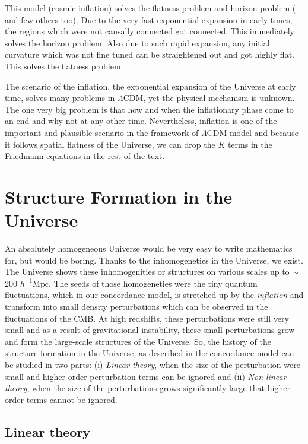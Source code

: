 This model (cosmic inflation) solves the flatness problem and horizon problem (
and few others too). Due to the very fast exponential expansion in early times, the
regions which were not causally connected got connected. This immediately solves
the horizon problem. Also due to such rapid expansion, any initial curvature which
was not fine tuned can be straightened out and got highly flat. This solves the
flatness problem. 

The scenario of the inflation, the exponential expansion of the Universe at 
early time, solves many problems in $\Lambda$CDM, yet the physical mechanism
is unknown. The one very big problem is that how and when the inflationary phase come
to an end and why not at any other time. Nevertheless, inflation is one of the
important and plausible scenario in the framework of $\Lambda$CDM model and because
it follows spatial flatness  of the Universe, we can drop the $K$ terms in the Friedmann
equations in the rest of the text.

\section{Structure Formation in the Universe}

An absolutely homogeneous Universe would be very easy to write mathematics for, but 
would be boring. Thanks to the inhomogeneties in the Universe, we exist. The Universe
shows these inhomogenities or structures on various scales up to $\sim$ 
200 $h^{-1} \mathrm{Mpc}$. The seeds
of those homogeneties were the tiny quantum fluctuations, which in our concordance 
model, is stretched up by the {\it inflation} and transform into small density
perturbations which can be observed in the  fluctuations of the CMB. 
At high redshifts, these perturbations were still very small and as 
a result of gravitational instability, these small perturbations 
grow and form the large-scale structures of the Universe. 
So, the history of the  structure formation in the Universe, as described in the 
concordance model can be studied in two parts: (i) {\it Linear theory}, when
the size of the perturbation were small and higher order perturbation terms can be ignored and 
(ii) {\it Non-linear theory}, when the size of the perturbations grows significantly
large that higher order terms cannot be ignored.

\subsection{Linear theory}

